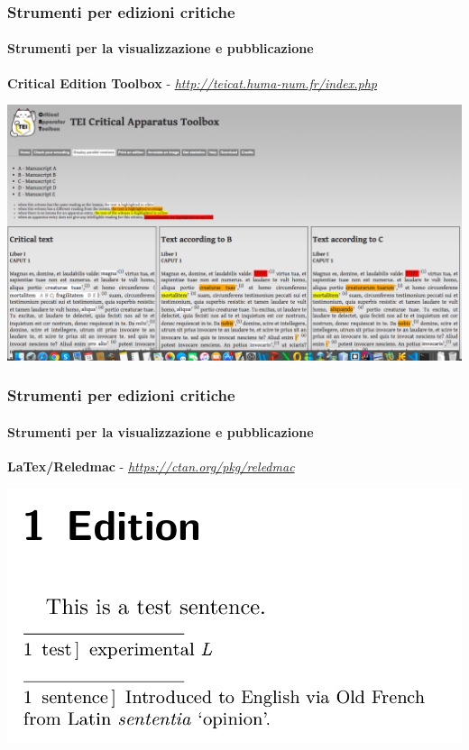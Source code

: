 \begin{frame}
    \frametitle{Strumenti per edizioni critiche}
    \framesubtitle{Strumenti per la visualizzazione e pubblicazione}
	\addtocounter{nframe}{1}
    \begin{center}
        \textbf{Critical Edition Toolbox} - \textit{\url{http://teicat.huma-num.fr/index.php}}
    \end{center}
    \begin{center}
        \includegraphics[width=.95\textwidth]{imgs/TEI-critical-app-toolbox.png}
	\end{center}
\end{frame}

\begin{frame}
    \frametitle{Strumenti per edizioni critiche}
    \framesubtitle{Strumenti per la visualizzazione e pubblicazione}
	\addtocounter{nframe}{1}
    \begin{center}
        \textbf{LaTex/Reledmac} -  \textit{\url{https://ctan.org/pkg/reledmac}}
    \end{center}
    \begin{center}
        \includegraphics[width=.95\textwidth]{imgs/reledmac-test.png}
	\end{center}
\end{frame}


